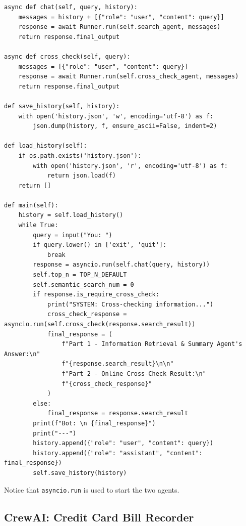 \begin{lstlisting}
async def chat(self, query, history):
    messages = history + [{"role": "user", "content": query}]
    response = await Runner.run(self.search_agent, messages)
    return response.final_output

async def cross_check(self, query):
    messages = [{"role": "user", "content": query}]
    response = await Runner.run(self.cross_check_agent, messages)
    return response.final_output

def save_history(self, history):
    with open('history.json', 'w', encoding='utf-8') as f:
        json.dump(history, f, ensure_ascii=False, indent=2)

def load_history(self):
    if os.path.exists('history.json'):
        with open('history.json', 'r', encoding='utf-8') as f:
            return json.load(f)
    return []

def main(self):
    history = self.load_history()
    while True:
        query = input("You: ")
        if query.lower() in ['exit', 'quit']:
            break
        response = asyncio.run(self.chat(query, history))
        self.top_n = TOP_N_DEFAULT
        self.semantic_search_num = 0
        if response.is_require_cross_check:
            print("SYSTEM: Cross-checking information...")
            cross_check_response = asyncio.run(self.cross_check(response.search_result))
            final_response = (
                f"Part 1 - Information Retrieval & Summary Agent's Answer:\n"
                f"{response.search_result}\n\n"
                f"Part 2 - Online Cross-Check Result:\n"
                f"{cross_check_response}"
            )
        else:
            final_response = response.search_result
        print(f"Bot: \n {final_response}")
        print("---")
        history.append({"role": "user", "content": query})
        history.append({"role": "assistant", "content": final_response})
        self.save_history(history)
\end{lstlisting}

Notice that \verb|asyncio.run| is used to start the two agents.

\subsection{CrewAI: Credit Card Bill Recorder}

